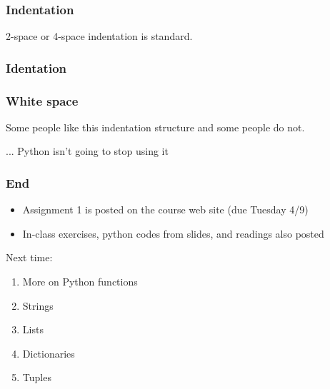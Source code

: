 \documentclass{beamer}
\begin{document}
\begin{frame}
\frametitle{Indentation}


2-space or 4-space indentation is standard.

\end{frame}


\begin{frame}
\frametitle{Identation}


\end{frame}

\begin{frame}
\frametitle{White space}

Some people like this indentation structure and some people do not.

\vspace{0.2in}

... Python isn't going to stop using it

\end{frame}


\begin{frame}
\frametitle{End}
\begin{itemize}
\setlength{\itemsep}{0.05in}
\item{Assignment 1 is posted on the course web site (due Tuesday 4/9)}
\item{In-class exercises, python codes from slides, and readings also posted}
\end{itemize}

Next time:
\begin{enumerate}
\setlength{\itemsep}{0.05in}
\item{More on Python functions}
\item{Strings}
\item{Lists}
\item{Dictionaries}
\item{Tuples}
\end{enumerate}

\end{frame}
\end{document}

